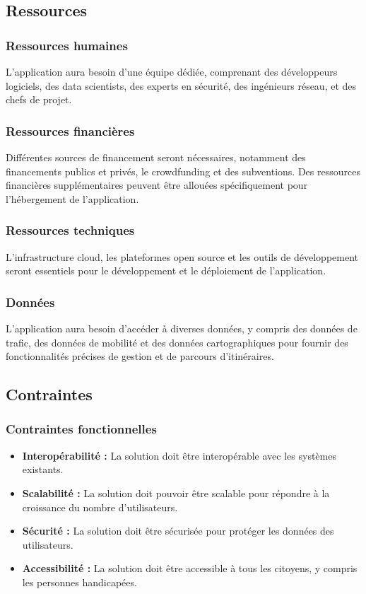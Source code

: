 \documentclass{article}
\begin{document}
\subsection{Ressources}

\subsubsection*{Ressources humaines}
L'application aura besoin d'une équipe dédiée, comprenant des développeurs logiciels, des data scientists, des experts en sécurité, des ingénieurs réseau, et des chefs de projet.

\subsubsection*{Ressources financières}
Différentes sources de financement seront nécessaires, notamment des financements publics et privés, le crowdfunding et des subventions. Des ressources financières supplémentaires peuvent être allouées spécifiquement pour l'hébergement de l'application.

\subsubsection*{Ressources techniques}
L'infrastructure cloud, les plateformes open source et les outils de développement seront essentiels pour le développement et le déploiement de l'application.

\subsubsection*{Données}
L'application aura besoin d'accéder à diverses données, y compris des données de trafic, des données de mobilité et des données cartographiques pour fournir des fonctionnalités précises de gestion et de parcours d'itinéraires.

\subsection{Contraintes}

\subsubsection*{Contraintes fonctionnelles}
\begin{itemize}
    \item \textbf{Interopérabilité :} La solution doit être interopérable avec les systèmes existants.
    \item \textbf{Scalabilité :} La solution doit pouvoir être scalable pour répondre à la croissance du nombre d'utilisateurs.
    \item \textbf{Sécurité :} La solution doit être sécurisée pour protéger les données des utilisateurs.
    \item \textbf{Accessibilité :} La solution doit être accessible à tous les citoyens, y compris les personnes handicapées.
\end{itemize}
\end{document}
